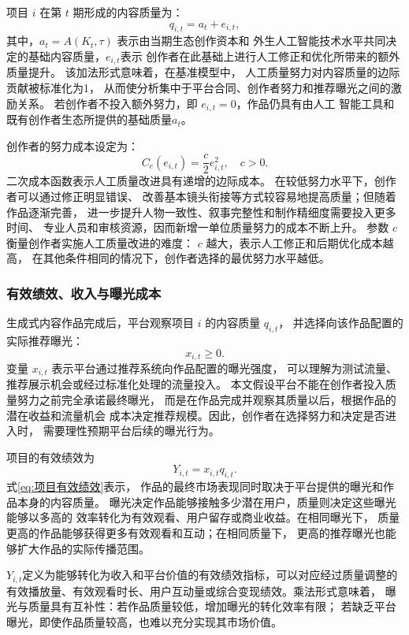 \documentclass[UTF8, a4paper, 12pt, fontset=fandol]{ctexart}
\theoremstyle{definition}
\theoremstyle{remark}
\begin{document}
项目 $i$ 在第 $t$ 期形成的内容质量为：
\begin{equation*}
  q_{i,t}=a_t+e_{i,t},
\end{equation*}
其中，$a_t = A(K_t,\tau)$ 表示由当期生态创作资本和
外生人工智能技术水平共同决定的基础内容质量，$e_{i,t}$表示
创作者在此基础上进行人工修正和优化所带来的额外质量提升。
该加法形式意味着，在基准模型中，
人工质量努力对内容质量的边际贡献被标准化为1，
从而使分析集中于平台合同、创作者努力和推荐曝光之间的激励关系。
若创作者不投入额外努力，即 $e_{i,t}=0$，作品仍具有由人工
智能工具和既有创作者生态所提供的基础质量$a_t$。

创作者的努力成本设定为：
\begin{equation*}
  C_e(e_{i,t})=\frac{c}{2}e_{i,t}^2,\quad c>0.
\end{equation*}
二次成本函数表示人工质量改进具有递增的边际成本。
在较低努力水平下，创作者可以通过修正明显错误、
改善基本镜头衔接等方式较容易地提高质量；但随着作品逐渐完善，
进一步提升人物一致性、叙事完整性和制作精细度需要投入更多时间、
专业人员和审核资源，因而新增一单位质量努力的成本不断上升。
参数 $c$ 衡量创作者实施人工质量改进的难度：
$c$ 越大，表示人工修正和后期优化成本越高，
在其他条件相同的情况下，创作者选择的最优努力水平越低。
\subsubsection{有效绩效、收入与曝光成本}
生成式内容作品完成后，平台观察项目 $i$ 的内容质量 $q_{i,t}$，
并选择向该作品配置的实际推荐曝光：
\begin{equation*}
  x_{i,t} \ge 0.
\end{equation*}
变量 $x_{i,t}$ 表示平台通过推荐系统向作品配置的曝光强度，
可以理解为测试流量、推荐展示机会或经过标准化处理的流量投入。
本文假设平台不能在创作者投入质量努力之前完全承诺最终曝光，
而是在作品完成并观察其质量以后，根据作品的潜在收益和流量机会
成本决定推荐规模。因此，创作者在选择努力和决定是否进入时，
需要理性预期平台后续的曝光行为。

项目的有效绩效为
\begin{equation}
  Y_{i,t} = x_{i,t}q_{i,t}.
  \label{eq:项目有效绩效}
\end{equation}
式\eqref{eq:项目有效绩效}表示，
作品的最终市场表现同时取决于平台提供的曝光和作品本身的内容质量。
曝光决定作品能够接触多少潜在用户，质量则决定这些曝光能够以多高的
效率转化为有效观看、用户留存或商业收益。在相同曝光下，
质量更高的作品能够获得更多有效观看和互动；在相同质量下，
更高的推荐曝光也能够扩大作品的实际传播范围。

$Y_{i,t}$定义为能够转化为收入和平台价值的有效绩效指标，可以对应经过质量调整的
有效播放量、有效观看时长、用户互动量或综合变现绩效。乘法形式意味着，
曝光与质量具有互补性：若作品质量较低，增加曝光的转化效率有限；
若缺乏平台曝光，即使作品质量较高，也难以充分实现其市场价值。
\end{document}
